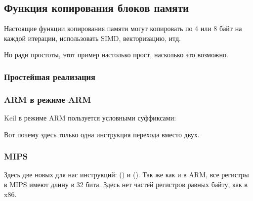﻿\subsection{Функция копирования блоков памяти}
\label{loop_memcpy}

Настоящие функции копирования памяти могут копировать по 4 или 8 байт на каждой итерации, использовать \ac{SIMD},
векторизацию, итд.

Но ради простоты, этот пример настолько прост, насколько это возможно.



\subsubsection{Простейшая реализация}







\subsubsection{ARM в режиме ARM}

Keil в режиме ARM пользуется условными суффиксами:



Вот почему здесь только одна инструкция перехода вместо двух.

\subsubsection{MIPS}



Здесь две новых для нас инструкций:  () и  ().
Так же как и в ARM, все регистры в MIPS имеют длину в 32 бита. Здесь нет частей регистров равных байту,
как в x86.


